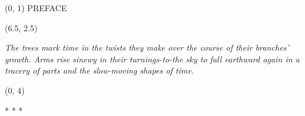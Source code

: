 \documentclass[10pt]{article}
\begin{document}
\begin{textblock}{23}(0, 1)
\center \huge PREFACE
\end{textblock}

\begin{textblock}{10}(6.5, 2.5)

\begin{center}
\textit{The trees mark time in the twists they make over the course of their
branches' growth. Arms rise sinewy in their turnings-to-the sky to fall
earthward again in a tracery of parts and the slow-moving shapes of time. }
\end{center}

\end{textblock}

\begin{textblock}{23}(0, 4)

\begin{center}
* * *
\end{center}

\end{textblock}
\end{document}
